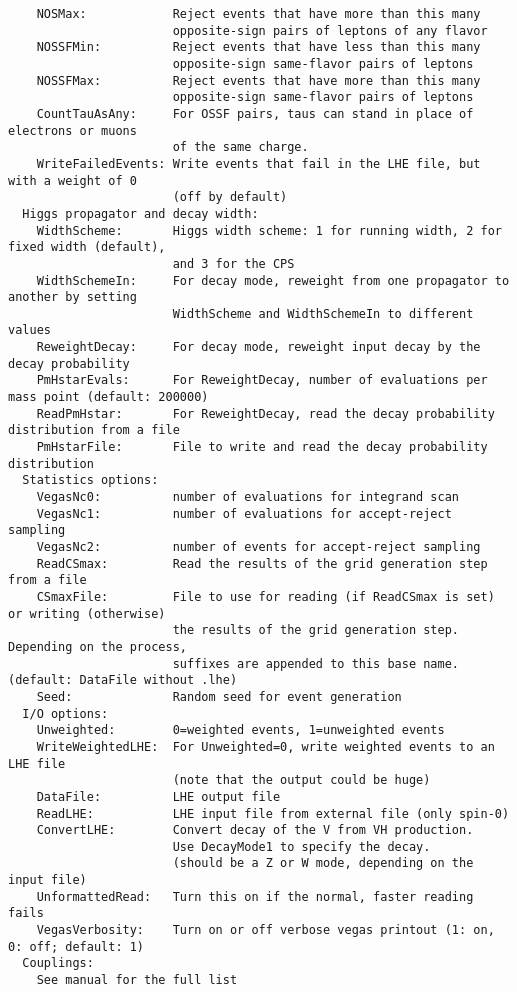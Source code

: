 \documentclass[aps,superscriptaddress,nofootinbib]{revtex4}
\begin{document}
\begin{verbatim}
    NOSMax:            Reject events that have more than this many
                       opposite-sign pairs of leptons of any flavor
    NOSSFMin:          Reject events that have less than this many
                       opposite-sign same-flavor pairs of leptons
    NOSSFMax:          Reject events that have more than this many
                       opposite-sign same-flavor pairs of leptons
    CountTauAsAny:     For OSSF pairs, taus can stand in place of electrons or muons
                       of the same charge.
    WriteFailedEvents: Write events that fail in the LHE file, but with a weight of 0
                       (off by default)
  Higgs propagator and decay width:
    WidthScheme:       Higgs width scheme: 1 for running width, 2 for fixed width (default),
                       and 3 for the CPS
    WidthSchemeIn:     For decay mode, reweight from one propagator to another by setting
                       WidthScheme and WidthSchemeIn to different values
    ReweightDecay:     For decay mode, reweight input decay by the decay probability
    PmHstarEvals:      For ReweightDecay, number of evaluations per mass point (default: 200000)
    ReadPmHstar:       For ReweightDecay, read the decay probability distribution from a file
    PmHstarFile:       File to write and read the decay probability distribution
  Statistics options:
    VegasNc0:          number of evaluations for integrand scan
    VegasNc1:          number of evaluations for accept-reject sampling
    VegasNc2:          number of events for accept-reject sampling
    ReadCSmax:         Read the results of the grid generation step from a file
    CSmaxFile:         File to use for reading (if ReadCSmax is set) or writing (otherwise)
                       the results of the grid generation step.  Depending on the process,
                       suffixes are appended to this base name. (default: DataFile without .lhe)
    Seed:              Random seed for event generation
  I/O options:
    Unweighted:        0=weighted events, 1=unweighted events
    WriteWeightedLHE:  For Unweighted=0, write weighted events to an LHE file
                       (note that the output could be huge)
    DataFile:          LHE output file
    ReadLHE:           LHE input file from external file (only spin-0)
    ConvertLHE:        Convert decay of the V from VH production.
                       Use DecayMode1 to specify the decay.
                       (should be a Z or W mode, depending on the input file)
    UnformattedRead:   Turn this on if the normal, faster reading fails
    VegasVerbosity:    Turn on or off verbose vegas printout (1: on, 0: off; default: 1)
  Couplings:
    See manual for the full list
\end{verbatim}
\end{document}
